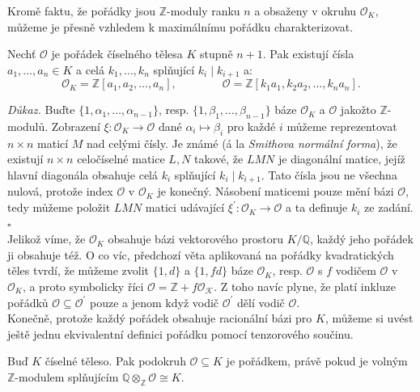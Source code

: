 \documentclass [12pt]{report}
\begin{document}
Kromě faktu, že pořádky jsou $\mathbb{Z}$-moduly ranku $n$ a obsaženy v okruhu $\mathcal{O}_K$, můžeme je přesně vzhledem k maximálnímu pořádku charakterizovat.

\begin{veta}
Nechť $\mathcal{O}$ je pořádek číselného tělesa $K$ stupně $n+1$. Pak existují čísla $a_1,\dots,a_n \in K$ a celá $k_1,\dots,k_n$ splňující $k_i \mid k_{i+1}$ a:
\begin{equation*}
\mathcal{O}_K = \mathbb{Z}[a_1,a_2,\dots,a_n], \qquad \qquad \mathcal{O} = \mathbb{Z}[k_1 a_1, k_2 a_2, \dots, k_n a_n].
\end{equation*}
\end{veta}
\noindent \textit{Důkaz.} Buďte $\lbrace 1,\alpha_1,\dots,\alpha_{n-1} \rbrace$, resp. $\lbrace 1,\beta_1,\dots,\beta_{n-1} \rbrace$ báze $\mathcal{O}_K$ a $\mathcal{O}$ jakožto $\mathbb{Z}$-modulů. Zobrazení $\xi:\mathcal{O}_K \longrightarrow \mathcal{O}$ dané $\alpha_i \longmapsto \beta_i$ pro každé $i$ můžeme reprezentovat $n \times n$ maticí $M$ nad celými čísly. Je známé (á la \textit{Smithova normální forma}), že existují $n \times n$ celočíselné matice $L,N$ takové, že $LMN$ je diagonální matice, jejíž hlavní diagonála obsahuje celá $k_i$ splňující $k_i \mid k_{i+1}$. Tato čísla jsou ne všechna nulová, protože index $\mathcal{O}$ v $\mathcal{O}_K$ je konečný. Násobení maticemi pouze mění bázi $\mathcal{O}$, tedy můžeme položit $LMN$ matici udávající $\xi^\prime : \mathcal{O}_K \longrightarrow \mathcal{O}$ a ta definuje $k_i$ ze zadání. \hfill $\square$\\

Jelikož víme, že $\mathcal{O}_K$ obsahuje bázi vektorového prostoru $K/\mathbb{Q}$, každý jeho pořádek ji obsahuje též. O co víc, předchozí věta aplikovaná na pořádky kvadratických těles tvrdí, že můžeme zvolit $\lbrace 1,d \rbrace$ a $\lbrace 1,fd \rbrace$ báze $\mathcal{O}_K$, resp. $\mathcal{O}$ s $f$ vodičem $\mathcal{O}$ v $\mathcal{O}_K$, a proto symbolicky říci $\mathcal{O} = \mathbb{Z}+ f\mathcal{O_K}$. Z toho navíc plyne, že platí inkluze pořádků $\mathcal{O} \subseteq \mathcal{O}^\prime$ pouze a jenom když vodič $\mathcal{O}^\prime$ dělí vodič $\mathcal{O}$.\\

Konečně, protože každý pořádek obsahuje racionální bázi pro $K$, můžeme si uvést ještě  jednu ekvivalentní definici pořádku pomocí tenzorového součinu.
\begin{dusledek}
Buď $K$ číselné těleso. Pak podokruh $\mathcal{O} \subseteq K$ je pořádkem, právě pokud je volným $\mathbb{Z}$-modulem splňujícím $\mathbb{Q} \otimes_{\mathbb{Z}} \mathcal{O} \cong K$.
\end{dusledek}
\end{document}
